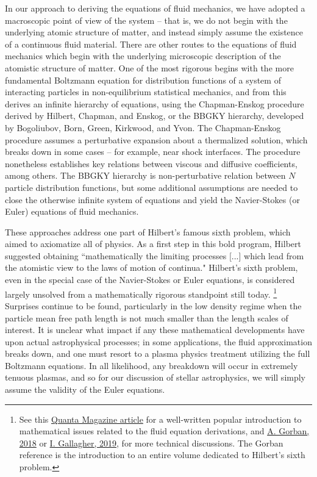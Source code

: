 \documentclass[notoc]{tufte-handout}
\begin{document}
In our approach to deriving the equations of fluid mechanics, we have adopted a macroscopic point of view of the system -- that is, we do not begin with the underlying atomic structure of matter, and instead simply assume the existence of a continuous fluid material.  There are other routes to the equations of fluid mechanics which begin with the underlying microscopic description of the atomistic structure of matter. One of the most rigorous begins with the more fundamental Boltzmann equation for distribution functions of a system of interacting particles in non-equilibrium statistical mechanics, and from this derives an infinite hierarchy of equations,  using the Chapman-Enskog procedure derived by Hilbert, Chapman, and Enskog, or the BBGKY hierarchy, developed by Bogoliubov, Born, Green, Kirkwood, and Yvon. The Chapman-Enskog procedure assumes a perturbative expansion about a thermalized solution, which breaks down in some cases -- for example, near shock interfaces. The procedure nonetheless establishes key relations between viscous and diffusive coefficients, among others. The BBGKY hierarchy is non-perturbative relation between $N$ particle distribution functions, but some additional assumptions are needed to close the otherwise infinite system of equations and yield the Navier-Stokes (or Euler) equations of fluid mechanics.

These approaches address one part of  Hilbert's famous sixth problem, which aimed to axiomatize all of physics.  As a first step in this bold program, Hilbert suggested obtaining ``mathematically the limiting processes [...] which lead from the atomistic view to the laws of motion of continua." Hilbert's sixth problem, even in the special case of the Navier-Stokes or Euler equations, is considered largely unsolved from a mathematically rigorous standpoint still today. \footnote {See this \href{https://www.quantamagazine.org/famous-fluid-equations-are-incomplete-20150721/} {Quanta Magazine article} for a well-written popular introduction to mathematical issues related to the fluid equation derivations, and \href {https://arxiv.org/abs/1803.03599} {A. Gorban, 2018} or \href {https://doi.org/10.1090/bull/1650 }{I. Gallagher, 2019}, for more technical discussions. The Gorban reference is the introduction to an entire volume dedicated to Hilbert's sixth problem.}  Surprises continue to be found, particularly in the low density regime when the particle mean free path length is not much smaller than the length scales of interest. It is unclear what impact if any these mathematical developments have upon actual astrophysical processes; in some applications, the fluid approximation breaks down, and one must resort to a plasma physics treatment utilizing the full Boltzmann equations. In all likelihood, any breakdown will occur in extremely tenuous plasmas, and so for our discussion of stellar astrophysics, we will simply assume the validity of the Euler equations.
\end{document}
